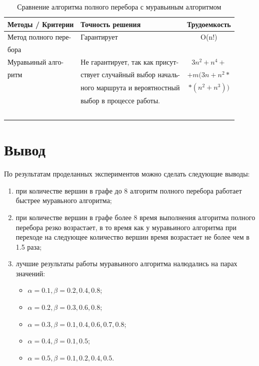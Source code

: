 \begin{table}[!ht]
    \centering
    \caption{\label{tab:sravn} Сравнение алгоритма полного перебора с муравьиным алгоритмом}
    \begin{tabular}{|l|l|c|}
    \hline
        Методы / Критерии & Точность решения & Трудоемкость \\ \hline
        
        Метод полного пере-& Гарантирует & O(n!) \\
        бора & ~ & ~ \\ \hline

        Муравьиный алго-& Не гарантирует, так как присут-& $3n^2+n^4+$\\ 
        ритм & ствует случайный выбор началь-& $+m(3n+n^2*$ \\
        ~ & ного маршрута и вероятностный& $*(n^2+n^3))$ \\
        ~ & выбор в процессе работы. & ~ \\ 
        ~ & ~ & ~ \\ \hline
    \end{tabular}
\end{table}

\section{Вывод}

По результатам проделанных экспериментов можно сделать следующие выводы:
\begin{enumerate}[left=\parindent]
    \item при количестве вершин в графе до 8 алгоритм полного перебора работает
        быстрее муравьного алгоритма;
    \item при количестве вершин в графе более 8 время выполнения алгоритма
        полного перебора резко возрастает, в то время как у муравьиного
        алгоритма при переходе на следующее количество вершин время возрастает
        не более чем в 1.5 раза;
    \item лучшие результаты работы муравьиного алгоритма налюдались на парах значений:
        \begin{itemize}
            \item $\alpha = 0.1, \beta = 0.2, 0.4, 0.8$;
            \item $\alpha = 0.2, \beta = 0.3, 0.6, 0.8$;
            \item $\alpha = 0.3, \beta = 0.1, 0.4, 0.6, 0.7, 0.8$;
            \item $\alpha = 0.4, \beta = 0.1, 0.5$;
            \item $\alpha = 0.5, \beta = 0.1, 0.2, 0.4, 0.5$.
        \end{itemize} 
\end{enumerate}

